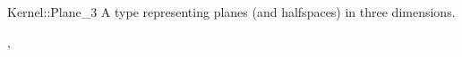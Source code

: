 \begin{ccRefConcept}{Kernel::Plane_3}
A type representing planes (and halfspaces) in three dimensions.

\ccRefines
{},

\ccSeeAlso
{}

\end{ccRefConcept}
